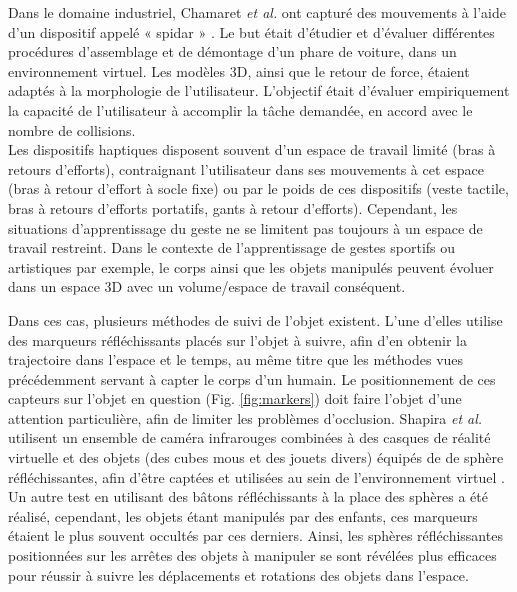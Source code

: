 Dans le domaine industriel, Chamaret \textit{et al.} ont capturé des mouvements à l'aide d'un dispositif appelé « spidar » \parencite{Chamaret2010}. Le but était d'étudier et d'évaluer différentes procédures d'assemblage et de démontage d'un phare de voiture, dans un environnement virtuel. Les modèles 3D, ainsi que le retour de force, étaient adaptés à la morphologie de l'utilisateur. L'objectif était d'évaluer empiriquement la capacité de l'utilisateur à accomplir la tâche demandée, en accord avec le nombre de collisions.\\

Les dispositifs haptiques disposent souvent d'un espace de travail limité (bras à retours d'efforts), contraignant l'utilisateur dans ses mouvements à cet espace (bras à retour d'effort à socle fixe) ou par le poids de ces dispositifs (veste tactile, bras à retours d'efforts portatifs, gants à retour d'efforts).  Cependant, les situations d'apprentissage du geste ne se limitent pas toujours à un espace de travail restreint. Dans le contexte de l'apprentissage de gestes sportifs ou artistiques par exemple, le corps ainsi que les objets manipulés peuvent évoluer dans un espace 3D avec un volume/espace de travail conséquent.

Dans ces cas, plusieurs méthodes de suivi de l'objet existent. L'une d'elles utilise des marqueurs réfléchissants placés sur l'objet à suivre, afin d'en obtenir la trajectoire dans l'espace et le temps, au même titre que les méthodes vues précédemment servant à capter le corps d'un humain. Le positionnement de ces capteurs sur l'objet en question (Fig. \ref{fig:markers}) doit faire l'objet d'une attention particulière, afin de limiter les problèmes d'occlusion. Shapira \textit{et al.} utilisent un ensemble de caméra infrarouges combinées à des casques de réalité virtuelle et des objets (des cubes mous et des jouets divers) équipés de de sphère réfléchissantes, afin d'être captées et utilisées au sein de l'environnement virtuel \parencite{Shapira2016TVR}. Un autre test en utilisant des bâtons réfléchissants à la place des sphères a été réalisé, cependant, les objets étant manipulés par des enfants, ces marqueurs étaient le plus souvent occultés par ces derniers. Ainsi, les sphères réfléchissantes positionnées sur les arrêtes des objets à manipuler se sont révélées plus efficaces pour réussir à suivre les déplacements et rotations des objets dans l'espace.

